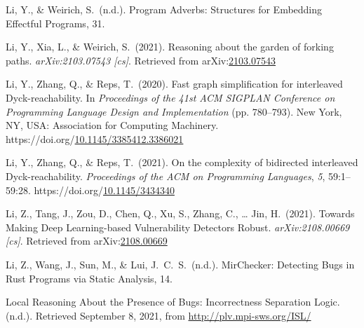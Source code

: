 \documentclass[12pt,twoside]{article}
\begin{document}
{\begin{thebibliography}{1079}
\mdbibitemlabel{}Li, Y., \& Weirich, S.~(n.d.). Program Adverbs: Structures for Embedding Eﬀectful Programs, 31.%

\mdbibitemlabel{}Li, Y., Xia, L., \& Weirich, S.~(2021). Reasoning about the garden of forking paths. \emph{arXiv:2103.07543 {}[cs]}. Retrieved from arXiv:\href{http://arxiv.org/abs/2103.07543}{2103.07543}%

\mdbibitemlabel{}Li, Y., Zhang, Q., \& Reps, T.~(2020). Fast graph simplification for interleaved Dyck-reachability. In \emph{Proceedings of the 41st ACM SIGPLAN Conference on Programming Language Design and Implementation} (pp. 780–793). New York, NY, USA: Association for Computing Machinery. https://doi.org/\href{https://dx.doi.org/10.1145/3385412.3386021}{10.1145/3385412.3386021}%

\mdbibitemlabel{}Li, Y., Zhang, Q., \& Reps, T.~(2021). On the complexity of bidirected interleaved Dyck-reachability. \emph{Proceedings of the ACM on Programming Languages}, \emph{5}, 59:1–59:28. https://doi.org/\href{https://dx.doi.org/10.1145/3434340}{10.1145/3434340}%

\mdbibitemlabel{}Li, Z., Tang, J., Zou, D., Chen, Q., Xu, S., Zhang, C., … Jin, H.~(2021). Towards Making Deep Learning-based Vulnerability Detectors Robust. \emph{arXiv:2108.00669 {}[cs]}. Retrieved from arXiv:\href{http://arxiv.org/abs/2108.00669}{2108.00669}%

\mdbibitemlabel{}Li, Z., Wang, J., Sun, M., \& Lui, J.~C.~S.~(n.d.). MirChecker: Detecting Bugs in Rust Programs via Static Analysis, 14.%

\mdbibitemlabel{}Local Reasoning About the Presence of Bugs: Incorrectness Separation Logic. (n.d.). Retrieved September 8, 2021, from \href{http://plv.mpi-sws.org/ISL/}{{\ttfamily http://\hspace{0pt}plv.\hspace{0pt}mpi-\hspace{0pt}sws.\hspace{0pt}org/\hspace{0pt}ISL/\hspace{0pt}}}%


\end{thebibliography}}
\end{document}
